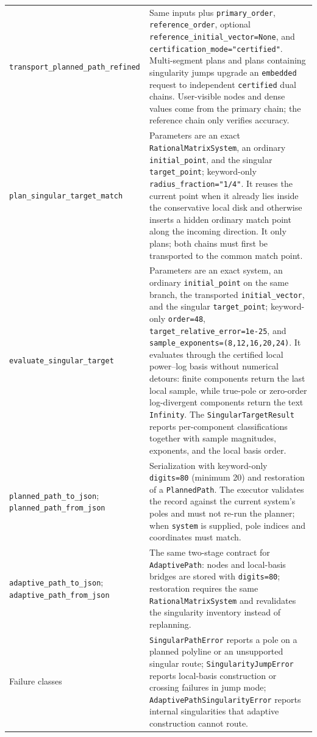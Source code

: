 \documentclass[11pt]{article}
\begin{document}
\begin{longtable}{L{0.36\textwidth}L{0.58\textwidth}}
\texttt{transport\_planned\_}\newline\texttt{path\_refined} & Same inputs plus
\texttt{primary\_order}, \texttt{reference\_order}, optional
\texttt{reference\_initial\_vector=None}, and \texttt{certification\_mode="certified"}.
Multi-segment plans and plans containing singularity jumps upgrade an \texttt{embedded}
request to independent \texttt{certified} dual chains.  User-visible nodes and dense values
come from the primary chain; the reference chain only verifies accuracy. \\
\texttt{plan\_singular\_}\newline\texttt{target\_match} & Parameters are an exact
\texttt{RationalMatrixSystem}, an ordinary \texttt{initial\_point}, and the singular
\texttt{target\_point}; keyword-only \texttt{radius\_fraction="1/4"}.  It reuses the current
point when it already lies inside the conservative local disk and otherwise inserts a hidden
ordinary match point along the incoming direction.  It only plans; both chains must first be
transported to the common match point. \\
\texttt{evaluate\_singular\_}\newline\texttt{target} & Parameters are an exact system, an
ordinary \texttt{initial\_point} on the same branch, the transported \texttt{initial\_vector},
and the singular \texttt{target\_point}; keyword-only \texttt{order=48},
\texttt{target\_relative\_error=1e-25}, and \texttt{sample\_exponents=(8,12,16,20,24)}.  It
evaluates through the certified local power--log basis without numerical detours: finite
components return the last local sample, while true-pole or zero-order log-divergent
components return the text \texttt{Infinity}.  The \texttt{SingularTargetResult} reports
per-component classifications together with sample magnitudes, exponents, and the local
basis order. \\
\texttt{planned\_path\_to\_json}; \texttt{planned\_path\_from\_json} & Serialization with
keyword-only \texttt{digits=80} (minimum 20) and restoration of a \texttt{PlannedPath}.  The
executor validates the record against the current system's poles and must not re-run the
planner; when \texttt{system} is supplied, pole indices and coordinates must match. \\
\texttt{adaptive\_path\_to\_}\newline\texttt{json};
\texttt{adaptive\_path\_from\_}\newline\texttt{json} & The same two-stage contract for
\texttt{AdaptivePath}: nodes and local-basis bridges are stored with \texttt{digits=80};
restoration requires the same \texttt{RationalMatrixSystem} and revalidates the singularity
inventory instead of replanning. \\
Failure classes & \texttt{SingularPathError} reports a pole on a planned polyline or an
unsupported singular route; \texttt{SingularityJumpError} reports local-basis construction
or crossing failures in jump mode; \texttt{AdaptivePathSingularityError} reports internal
singularities that adaptive construction cannot route. \\
\bottomrule
\end{longtable}
\normalsize
\end{document}
